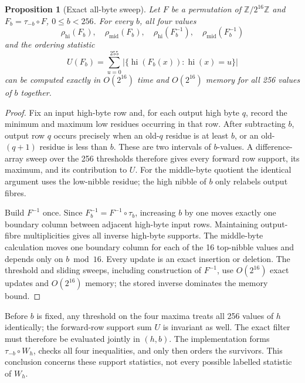 \documentclass[10pt]{article}
\theoremstyle{plain}
\newtheorem{proposition}[theorem]{Proposition}
\theoremstyle{definition}
\theoremstyle{remark}
\newcommand{\W}{\mathbb Z/2^{16}\mathbb Z}
\newcommand{\hi}{\operatorname{hi}}
\newcommand{\midb}{\operatorname{mid}}
\begin{document}
\begin{proposition}[Exact all-byte sweep]
\label{prop:bytesweep}
Let \(F\) be a permutation of \(\W\) and \(F_b=\tau_{-b}\circ F\),
\(0\leq b<256\).  For every \(b\), all four values
\[
 \rho_{\hi}(F_b),\quad \rho_{\midb}(F_b),\quad
 \rho_{\hi}(F_b^{-1}),\quad \rho_{\midb}(F_b^{-1})
\]
and the ordering statistic
\begin{equation}
 U(F_b)=\sum_{u=0}^{255}
 \bigl|\{\hi(F_b(x)):\hi(x)=u\}\bigr|
 \label{eq:statesupport}
\end{equation}
can be computed exactly in \(O(2^{16})\) time and \(O(2^{16})\) memory
for all 256 values of \(b\) together.
\end{proposition}
\begin{proof}
Fix an input high-byte row and, for each output high byte \(q\), record the
minimum and maximum low residues occurring in that row.  After subtracting
\(b\), output row \(q\) occurs precisely when an old-\(q\) residue is at least
\(b\), or an old-\((q+1)\) residue is less than \(b\).  These are two intervals
of \(b\)-values.  A difference-array sweep over the 256 thresholds therefore
gives every forward row support, its maximum, and its contribution to \(U\).
For the middle-byte quotient the identical argument uses the low-nibble
residue; the high nibble of \(b\) only relabels output fibres.

Build \(F^{-1}\) once.  Since \(F_b^{-1}=F^{-1}\circ\tau_b\), increasing \(b\)
by one moves exactly one boundary column between adjacent high-byte input
rows.  Maintaining output-fibre multiplicities gives all inverse high-byte
supports.  The middle-byte calculation moves one boundary column for each
of the 16 top-nibble values and depends only on \(b\bmod16\).  Every update is
an exact insertion or deletion.  The threshold and sliding sweeps, including construction of \(F^{-1}\),
use \(O(2^{16})\) exact updates and \(O(2^{16})\) memory; the stored inverse
dominates the memory bound.
\end{proof}

Before \(b\) is fixed, any threshold on the four maxima treats all 256 values
of \(h\) identically; the forward-row support sum \(U\) is invariant as well.
The exact filter must therefore be evaluated jointly in \((h,b)\).  The
implementation forms \(\tau_{-b}\circ W_h\), checks all four inequalities, and
only then orders the survivors.  This conclusion concerns these support
statistics, not every possible labelled statistic of \(W_h\).
\end{document}
